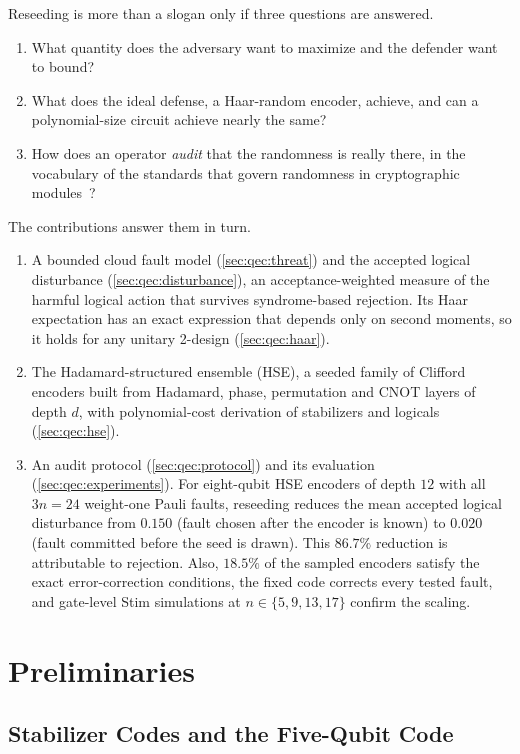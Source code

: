 Reseeding is more than a slogan only if three questions are answered.
\begin{enumerate}
  \item What quantity does the adversary want to maximize and the defender want to bound?
  \item What does the ideal defense, a Haar-random encoder, achieve, and can a polynomial-size circuit achieve nearly the same?
  \item How does an operator \emph{audit} that the randomness is really there, in the vocabulary of the standards that govern randomness in cryptographic modules~\cite{nist2015sp80090a,nist2019fips1403}?
\end{enumerate}
The contributions answer them in turn.
\begin{enumerate}
  \item A bounded cloud fault model (\cref{sec:qec:threat}) and the accepted logical disturbance (\cref{sec:qec:disturbance}), an acceptance-weighted measure of the harmful logical action that survives syndrome-based rejection. Its Haar expectation has an exact expression that depends only on second moments, so it holds for any unitary 2-design (\cref{sec:qec:haar}).
  \item The Hadamard-structured ensemble (HSE), a seeded family of Clifford encoders built from Hadamard, phase, permutation and CNOT layers of depth $d$, with polynomial-cost derivation of stabilizers and logicals (\cref{sec:qec:hse}).
  \item An audit protocol (\cref{sec:qec:protocol}) and its evaluation (\cref{sec:qec:experiments}). For eight-qubit HSE encoders of depth $12$ with all $3n=24$ weight-one Pauli faults, reseeding reduces the mean accepted logical disturbance from $0.150$ (fault chosen after the encoder is known) to $0.020$ (fault committed before the seed is drawn). This $86.7\%$ reduction is attributable to rejection. Also, $18.5\%$ of the sampled encoders satisfy the exact error-correction conditions, the fixed  code corrects every tested fault, and gate-level Stim simulations at $n\in\{5,9,13,17\}$ confirm the scaling.
\end{enumerate}

\section{Preliminaries}\label{sec:qec:prelim}

\subsection{Stabilizer Codes and the Five-Qubit Code}\label{sec:qec:stabilizer}

